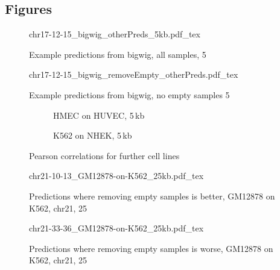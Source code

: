 \begin{appendices}
\section*{Figures}
\begin{figure}[h]
 \centering
 \scriptsize
 {chr17-12-15_bigwig_otherPreds_5kb.pdf_tex}
 \caption{Example predictions from bigwig, all samples, \SI{5}{\kilo\bp}}
 \label{fig:app:bw:others:5k}
\end{figure}
\begin{figure}[hb]
 \centering
 \scriptsize
 {chr17-12-15_bigwig_removeEmpty_otherPreds.pdf_tex}
 \caption{Example predictions from bigwig, no empty samples \SI{5}{\kilo\bp}}
 \label{fig:app:bw:noEmpty:others:5k}
\end{figure}
\begin{figure}[hb]
\centering
\begin{subfigure}{0.495\textwidth}
 \centering
 \caption{HMEC on HUVEC, 5\,kb}
 \label{fig:app:Pearson:HMEC:HUVEC:5k}
\end{subfigure}\hfill
\begin{subfigure}{0.495\textwidth}
 \centering
 \caption{K562 on NHEK, 5\,kb}
 \label{fig:app:Pearson:K562:NHEK:5k}
 \end{subfigure}
 \caption{Pearson correlations for further cell lines}
 \label{fig:app:Pearson:furtherCellLines}
\end{figure}
\begin{figure}[hb]
 \centering
 \scriptsize
 {chr21-10-13_GM12878-on-K562_25kb.pdf_tex}
 \caption{Predictions where removing empty samples is better, GM12878 on K562, chr21, \SI{25}{\kilo\bp}}
 \label{fig:app:GM12878:K562:chr21:25k:goodToRemove}
\end{figure}
\begin{figure}[hb]
 \centering
 \scriptsize
 {chr21-33-36_GM12878-on-K562_25kb.pdf_tex}
 \caption{Predictions where removing empty samples is worse, GM12878 on K562, chr21, \SI{25}{\kilo\bp}}
 \label{fig:app:GM12878:K562:chr21:25k:badToRemove}
\end{figure}


\end{appendices}
